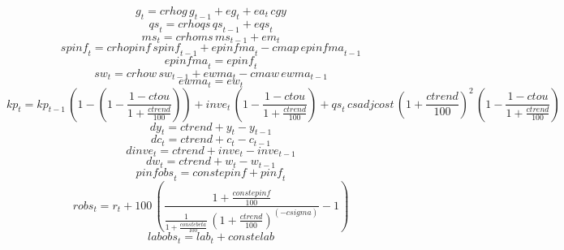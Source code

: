 \begin{dmath}
{g}_{t}={crhog}\, {g}_{t-1}+{eg}_{t}+{ea}_{t}\, {cgy}
\end{dmath}
\begin{dmath}
{qs}_{t}={crhoqs}\, {qs}_{t-1}+{eqs}_{t}
\end{dmath}
\begin{dmath}
{ms}_{t}={crhoms}\, {ms}_{t-1}+{em}_{t}
\end{dmath}
\begin{dmath}
{spinf}_{t}={crhopinf}\, {spinf}_{t-1}+{epinfma}_{t}-{cmap}\, {epinfma}_{t-1}
\end{dmath}
\begin{dmath}
{epinfma}_{t}={epinf}_{t}
\end{dmath}
\begin{dmath}
{sw}_{t}={crhow}\, {sw}_{t-1}+{ewma}_{t}-{cmaw}\, {ewma}_{t-1}
\end{dmath}
\begin{dmath}
{ewma}_{t}={ew}_{t}
\end{dmath}
\begin{dmath}
{kp}_{t}={kp}_{t-1}\, \left(1-\left(1-\frac{1-{ctou}}{1+\frac{{ctrend}}{100}}\right)\right)+{inve}_{t}\, \left(1-\frac{1-{ctou}}{1+\frac{{ctrend}}{100}}\right)+{qs}_{t}\, {csadjcost}\, \left(1+\frac{{ctrend}}{100}\right)^{2}\, \left(1-\frac{1-{ctou}}{1+\frac{{ctrend}}{100}}\right)
\end{dmath}
\begin{dmath}
{dy}_{t}={ctrend}+{y}_{t}-{y}_{t-1}
\end{dmath}
\begin{dmath}
{dc}_{t}={ctrend}+{c}_{t}-{c}_{t-1}
\end{dmath}
\begin{dmath}
{dinve}_{t}={ctrend}+{inve}_{t}-{inve}_{t-1}
\end{dmath}
\begin{dmath}
{dw}_{t}={ctrend}+{w}_{t}-{w}_{t-1}
\end{dmath}
\begin{dmath}
{pinfobs}_{t}={constepinf}+{pinf}_{t}
\end{dmath}
\begin{dmath}
{robs}_{t}={r}_{t}+100\, \left(\frac{1+\frac{{constepinf}}{100}}{\frac{1}{1+\frac{{constebeta}}{100}}\, \left(1+\frac{{ctrend}}{100}\right)^{\left(-{csigma}\right)}}-1\right)
\end{dmath}
\begin{dmath}
{labobs}_{t}={lab}_{t}+{constelab}
\end{dmath}
